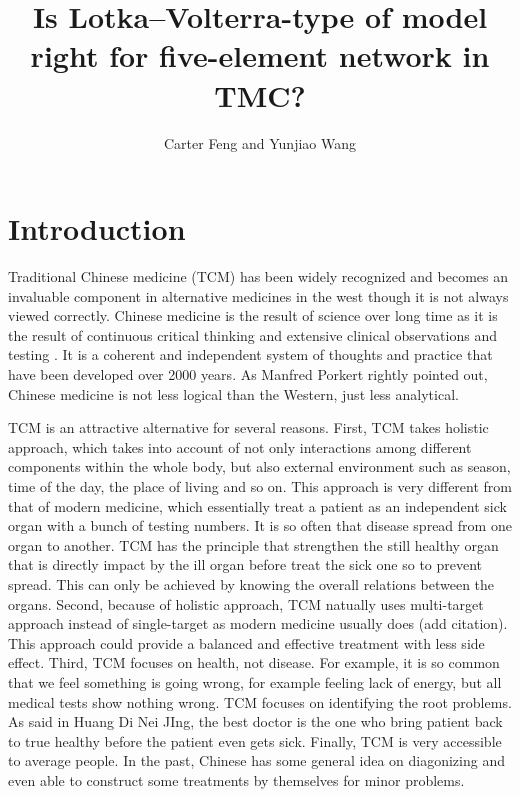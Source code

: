 \documentclass{article}
\title{Is Lotka–Volterra-type of model right for five-element network in TMC?}
\author{Carter Feng and Yunjiao Wang}
\begin{document}
\maketitle
\begin{abstract}
    
\end{abstract}
\section{Introduction}

Traditional Chinese medicine (TCM) has been widely recognized  and becomes an invaluable component in alternative medicines in the west \cite{Kaptchuk2000} though it is not always viewed correctly.   Chinese medicine is the result of science over long time as it is the result of continuous critical thinking and extensive clinical observations and testing \cite{Kaptchuk2000}. It is a coherent and independent system of thoughts and practice that have been developed over 2000 years.   As Manfred Porkert \cite{Porkert1990} rightly pointed out, Chinese medicine is not less logical than the Western, just less analytical. 

TCM is an attractive alternative for several reasons.
First, TCM takes holistic approach, which takes into account of not only interactions among different components within the whole body, but also external environment such as season, time of the day, the place of living and so on. This approach is very different from that of modern medicine, which essentially treat a patient as an independent sick organ with a bunch of testing numbers. It is so often that disease spread from one organ to another. TCM has the principle that strengthen the still healthy organ that is directly impact by the ill organ before treat the sick one so to prevent spread. This can only be achieved by knowing the overall relations between the organs. Second, because of holistic approach, TCM natually uses multi-target approach instead of single-target as  modern medicine usually does (add citation). This approach could provide a balanced and effective treatment with less side effect. Third, TCM focuses on health, not disease. For example, it is so common that we feel something is going wrong, for example feeling lack of energy, but all medical tests show nothing wrong.  TCM focuses on identifying the root problems. As said in Huang Di Nei JIng, the best doctor is the one who bring patient back to true healthy before the patient even gets sick. 
Finally,  TCM  is very  accessible to average people. In the past, Chinese has some general idea on diagonizing and even able to construct some treatments by themselves for minor problems. 
\end{document}
